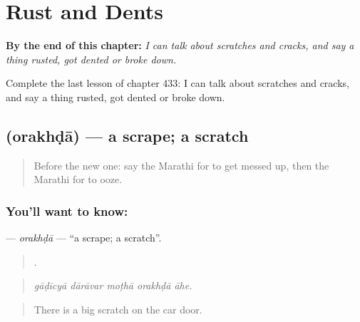 
\chapter{Rust and Dents}
\label{ch:mr-rust-and-dents}

\begin{chapteropening}
\textbf{By the end of this chapter:} \emph{I can talk about scratches and cracks, and say a thing rusted, got dented or broke down.}

Complete the last lesson of chapter 433: I can talk about scratches and cracks, and say a thing rusted, got dented or broke down.
\end{chapteropening}

\section[\texorpdfstring{\mr{ओरखडा} (orakhḍā)}{ओरखडा (orakhḍā)}]{ (orakhḍā) — a scrape; a scratch}

\label{lesson:MR-C433-orakhda}



\begin{quote}
Before the new one: say the Marathi for to get messed up, then the Marathi for to ooze.
\end{quote}

\subsection*{You'll want to know: }
\textbf{} — \emph{orakhḍā} — \textquotedblleft{}a scrape; a scratch\textquotedblright{}.

\begin{quote}
    .
\end{quote}

\begin{quote}
\emph{gāḍīcyā dārāvar moṭhā orakhḍā āhe.}
\end{quote}

\begin{quote}
There is a big scratch on the car door.
\end{quote}

